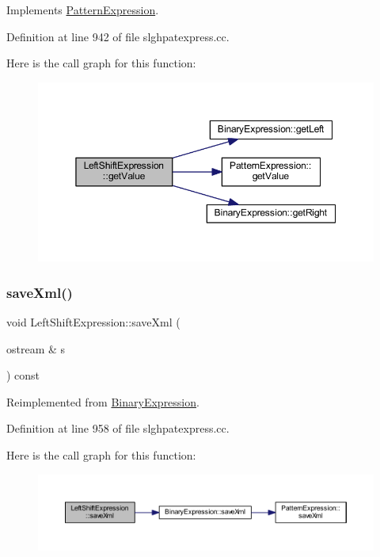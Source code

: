 Implements \mbox{\hyperlink{class_pattern_expression_a8332c6ea4c5a7e9dfc690df2a6458bb8}{Pattern\+Expression}}.



Definition at line 942 of file slghpatexpress.\+cc.

Here is the call graph for this function\+:
\nopagebreak
\begin{figure}[H]
\begin{center}
\leavevmode
\includegraphics[width=350pt]{class_left_shift_expression_a5d12d4e5dd1ae8ce9bc88695b9bdf736_cgraph}
\end{center}
\end{figure}
\mbox{\label{class_left_shift_expression_a2ddfd821596bb45f2c1b5fcd4ca2f764}} 
\subsubsection{\texorpdfstring{saveXml()}{saveXml()}}
{\footnotesize\ttfamily void Left\+Shift\+Expression\+::save\+Xml (\begin{DoxyParamCaption}\item[{ostream \&}]{s }\end{DoxyParamCaption}) const\hspace{0.3cm}{\ttfamily [virtual]}}



Reimplemented from \mbox{\hyperlink{class_binary_expression_a4b9e768a619b713d6c1ff35a618d98ec}{Binary\+Expression}}.



Definition at line 958 of file slghpatexpress.\+cc.

Here is the call graph for this function\+:
\nopagebreak
\begin{figure}[H]
\begin{center}
\leavevmode
\includegraphics[width=350pt]{class_left_shift_expression_a2ddfd821596bb45f2c1b5fcd4ca2f764_cgraph}
\end{center}
\end{figure}


